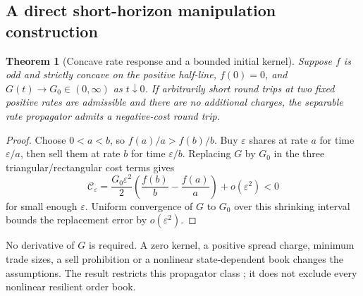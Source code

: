 \documentclass[11pt]{article}
\numberwithin{equation}{section}
\newtheorem{theorem}{Theorem}[section]
\theoremstyle{definition}
\theoremstyle{remark}
\theoremstyle{definition}
\begin{document}
\subsection{A direct short-horizon manipulation construction}
\begin{theorem}[Concave rate response and a bounded initial kernel]
\label{thm:expnonlinear}
Suppose $f$ is odd and strictly concave on the positive half-line, $f(0)=0$,
and $G(t)\to G_0\in(0,\infty)$ as $t\downarrow0$. If arbitrarily short
round trips at two fixed positive rates are admissible and there are no
additional charges, the separable rate propagator admits a negative-cost
round trip.
\end{theorem}
\begin{proof}
Choose $0<a<b$, so $f(a)/a>f(b)/b$. Buy $\varepsilon$ shares at rate $a$
for time $\varepsilon/a$, then sell them at rate $b$ for time
$\varepsilon/b$. Replacing $G$ by $G_0$ in the three triangular/rectangular
cost terms gives
\[
 \mathcal C_\varepsilon
 =\frac{G_0\varepsilon^2}{2}
       \left(\frac{f(b)}b-\frac{f(a)}a\right)+o(\varepsilon^2)<0
\]
for small enough $\varepsilon$. Uniform convergence of $G$ to $G_0$ over
this shrinking interval bounds the replacement error by $o(\varepsilon^2)$.
\end{proof}
No derivative of $G$ is required. A zero kernel, a positive spread charge,
minimum trade sizes, a sell prohibition or a nonlinear state-dependent book
changes the assumptions. The result restricts this propagator class
\citep{gatheral2010,curato2017}; it does not exclude every nonlinear resilient
order book.
\end{document}
